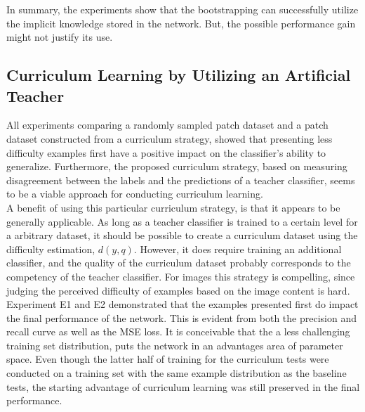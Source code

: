 In summary, the experiments show that the bootstrapping can successfully utilize the implicit knowledge stored in the network. But, the possible performance gain might not justify its use. \\


\subsection{Curriculum Learning by Utilizing an Artificial Teacher}
All experiments comparing a randomly sampled patch dataset and a patch dataset constructed from a curriculum strategy, showed that presenting less difficulty examples first have a positive impact on the classifier's ability to generalize.  Furthermore, the proposed curriculum strategy, based on measuring disagreement between the labels and the predictions of a teacher classifier, seems to be a viable approach for conducting curriculum learning. \\

A benefit of using this particular curriculum strategy, is that it appears to be generally applicable. As long as a teacher classifier is trained to a certain level for a arbitrary dataset, it should be possible to create a curriculum dataset using the difficulty estimation, $d(y,q)$. However, it does require training an additional classifier, and the quality of the curriculum dataset probably corresponds to the competency of the teacher classifier. For images this strategy is compelling, since judging the perceived difficulty of examples based on the image content is hard.\\

Experiment E1 and E2 demonstrated that the examples presented first do impact the final performance of the network. This is evident from both the precision and recall curve as well as the MSE loss. It is conceivable that the a less challenging training set distribution, puts the network in an advantages area of parameter space. Even though the latter half of training for the curriculum tests were conducted on a training set with the same example distribution as the baseline tests, the starting advantage of curriculum learning was still preserved in the final performance.  \\

